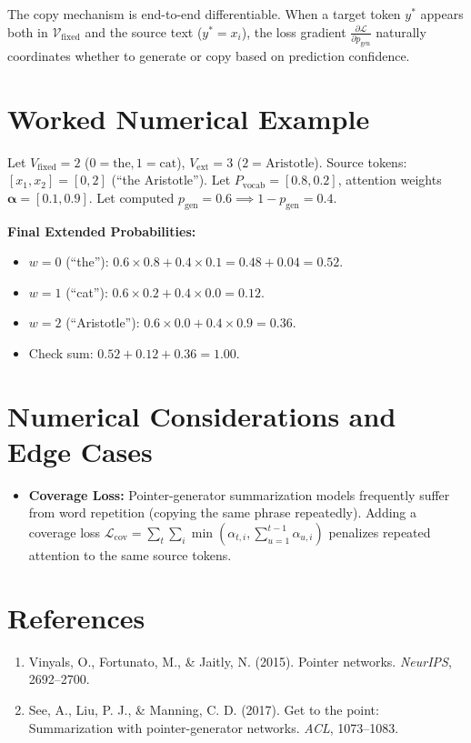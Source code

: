 \documentclass[11pt,a4paper]{article}
\theoremstyle{definition}
\begin{document}
The copy mechanism is end-to-end differentiable. When a target token $y^*$ appears both in $\mathcal{V}_{\text{fixed}}$ and the source text ($y^* = x_i$), the loss gradient $\frac{\partial \mathcal{L}}{\partial p_{\text{gen}}}$ naturally coordinates whether to generate or copy based on prediction confidence.

\section{Worked Numerical Example}

Let $V_{\text{fixed}} = 2$ ($0=\text{the}, 1=\text{cat}$), $V_{\text{ext}} = 3$ ($2=\text{Aristotle}$).
Source tokens: $[x_1, x_2] = [0, 2]$ (``the Aristotle'').
Let $P_{\text{vocab}} = [0.8, 0.2]$, attention weights $\boldsymbol{\alpha} = [0.1, 0.9]$.
Let computed $p_{\text{gen}} = 0.6 \implies 1 - p_{\text{gen}} = 0.4$.

\textbf{Final Extended Probabilities:}
\begin{itemize}
    \item $w=0$ (``the''): $0.6 \times 0.8 + 0.4 \times 0.1 = 0.48 + 0.04 = 0.52$.
    \item $w=1$ (``cat''): $0.6 \times 0.2 + 0.4 \times 0.0 = 0.12$.
    \item $w=2$ (``Aristotle''): $0.6 \times 0.0 + 0.4 \times 0.9 = 0.36$.
    \item Check sum: $0.52 + 0.12 + 0.36 = 1.00$.
\end{itemize}

\section{Numerical Considerations and Edge Cases}

\begin{itemize}
    \item \textbf{Coverage Loss:} Pointer-generator summarization models frequently suffer from word repetition (copying the same phrase repeatedly). Adding a coverage loss $\mathcal{L}_{\text{cov}} = \sum_t \sum_i \min(\alpha_{t, i}, \sum_{u=1}^{t-1} \alpha_{u, i})$ penalizes repeated attention to the same source tokens.
\end{itemize}

\section{References}
\begin{enumerate}
    \item Vinyals, O., Fortunato, M., \& Jaitly, N. (2015). Pointer networks. \emph{NeurIPS}, 2692--2700.
    \item See, A., Liu, P. J., \& Manning, C. D. (2017). Get to the point: Summarization with pointer-generator networks. \emph{ACL}, 1073--1083.
\end{enumerate}
\end{document}
